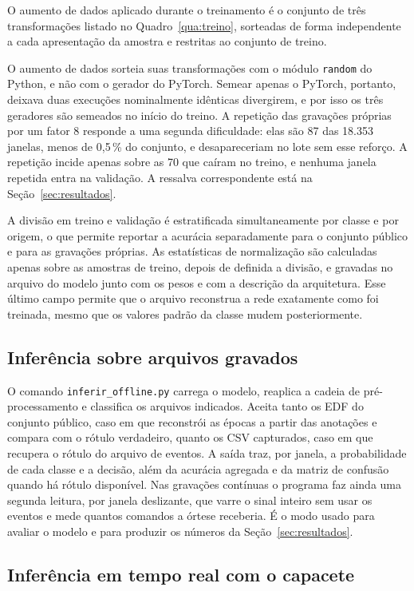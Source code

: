 \documentclass[12pt,a4paper]{article}
\begin{document}
O aumento de dados aplicado durante o treinamento é o conjunto de três
transformações listado no Quadro~\ref{qua:treino}, sorteadas de forma independente a cada
apresentação da amostra e restritas ao conjunto de treino.

O aumento de dados sorteia suas transformações com o módulo \texttt{random} do Python, e não
com o gerador do PyTorch. Semear apenas o PyTorch, portanto, deixava duas execuções
nominalmente idênticas divergirem, e por isso os três geradores são semeados no início do
treino. A repetição das gravações próprias por um fator 8 responde a uma segunda dificuldade:
elas são 87 das 18.353 janelas, menos de 0,5\,\% do conjunto, e desapareceriam no lote sem
esse reforço. A repetição incide apenas sobre as 70 que caíram no treino, e nenhuma janela
repetida entra na validação. A ressalva correspondente está na Seção~\ref{sec:resultados}.

A divisão em treino e validação é estratificada simultaneamente por classe e por origem, o que
permite reportar a acurácia separadamente para o conjunto público e para as gravações
próprias. As estatísticas de normalização são calculadas apenas sobre as amostras de treino,
depois de definida a divisão, e gravadas no arquivo do modelo junto com os pesos e com a
descrição da arquitetura. Esse último campo permite que o arquivo reconstrua a rede exatamente
como foi treinada, mesmo que os valores padrão da classe mudem posteriormente.

\subsection{Inferência sobre arquivos gravados}

O comando \texttt{inferir\_offline.py} carrega o modelo, reaplica a cadeia de pré-processamento
e classifica os arquivos indicados. Aceita tanto os EDF do conjunto público, caso em que
reconstrói as épocas a partir das anotações e compara com o rótulo verdadeiro, quanto os CSV
capturados, caso em que recupera o rótulo do arquivo de eventos. A saída traz, por janela, a
probabilidade de cada classe e a decisão, além da acurácia agregada e da matriz de confusão
quando há rótulo disponível. Nas gravações contínuas o programa faz ainda uma segunda leitura,
por janela deslizante, que varre o sinal inteiro sem usar os eventos e mede quantos comandos a
órtese receberia. É o modo usado para avaliar o modelo e para produzir os números da
Seção~\ref{sec:resultados}.

\subsection{Inferência em tempo real com o capacete}\label{subsec:online}
\end{document}
